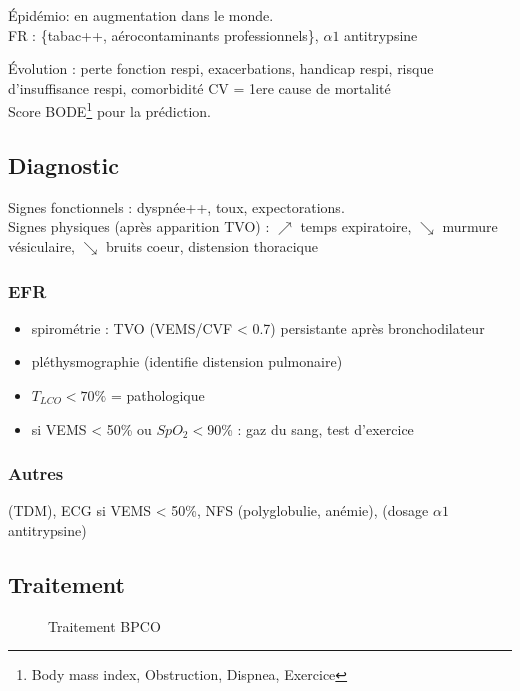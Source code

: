 \documentclass{article}
\begin{document}
Épidémio: en augmentation dans le monde. \\
FR : \{tabac++, aérocontaminants professionnels\}, \(\alpha{}1\) antitrypsine

Évolution : perte fonction respi, exacerbations, handicap respi, risque
d'insuffisance respi, comorbidité CV = 1ere cause de mortalité\\
Score BODE\footnote{Body mass index, Obstruction, Dispnea, Exercice} pour la prédiction.

\subsection{Diagnostic}
Signes fonctionnels : dyspnée++, toux, expectorations.\\
Signes physiques (après apparition TVO) : \(\nearrow\) temps expiratoire,
\(\searrow\) murmure vésiculaire, $\searrow$ bruits coeur, distension thoracique

\subsubsection{EFR}
\begin{itemize}
\item spirométrie : TVO (VEMS/CVF < 0.7) persistante après bronchodilateur
\item pléthysmographie (identifie distension pulmonaire)
\item $T_{LCO} < 70\%$ = pathologique
\item si VEMS < 50\% ou $SpO_2< 90$\% : gaz du sang, test d'exercice
\end{itemize}

\subsubsection{Autres}
(TDM), ECG si VEMS < 50\%, NFS (polyglobulie, anémie), (dosage \(\alpha1\) antitrypsine)

\subsection{Traitement}
\begin{figure}[htpb]
  \centering
  \caption{Traitement BPCO}
\end{figure}
\end{document}
